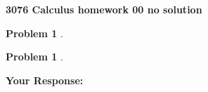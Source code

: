 \documentclass[12pt,dvipsnames]{article}
\title{}
\author{ }
\date{}
\begin{document}
\maketitle
\begin{center}
\textbf{{\large 3076 Calculus homework 00 no solution}}
\end{center} 


\textbf{Problem 1} .\\

\vspace{2cm}


\textbf{Problem 1} .\\

\vspace{2cm}

\textbf{Your Response:}
\end{document}
